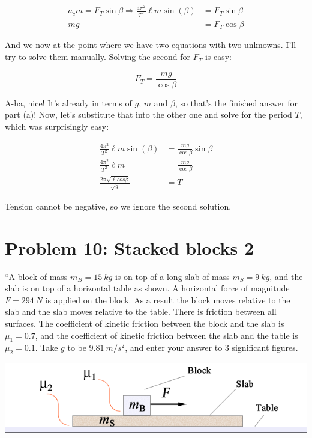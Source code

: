 \documentclass[8.01x]{subfiles}
\begin{document}
\begin{align}
a_c m = F_T \sin \beta \Rightarrow \frac{4\pi^2}{T^2} \ell m \sin (\beta) &= F_T \sin \beta\\
m g &= F_T \cos \beta
\end{align}

And we now at the point where we have two equations with two unknowns. I'll try to solve them manually. Solving the second for $F_T$ is easy:

\begin{equation}
F_T = \frac{m g}{\cos \beta}
\end{equation}

A-ha, nice! It's already in terms of $g$, $m$ and $\beta$, so that's the finished answer for part (a)! Now, let's substitute that into the other one and solve for the period $T$, which was surprisingly easy:

\begin{align}
\frac{4\pi^2}{T^2} \ell m \sin (\beta) &= \frac{m g}{\cos \beta} \sin \beta\\
\frac{4\pi^2}{T^2} \ell m &= \frac{m g}{\cos \beta}\\
\frac{2 \pi \sqrt{\ell cos \beta}}{\sqrt{g}} &= T
\end{align}

Tension cannot be negative, so we ignore the second solution.

\section{Problem 10: Stacked blocks 2}

``A block of mass $m_B = \SI{15}{kg}$ is on top of a long slab of mass $m_S = \SI{9}{kg}$, and the slab is on top of a horizontal table as shown. A horizontal force of magnitude $F = \SI{294}{N}$ is applied on the block. As a result the block moves relative to the slab and the slab moves relative to the table. There is friction between all surfaces. The coefficient of kinetic friction between the block and the slab is $\mu_1 = 0.7$, and the coefficient of kinetic friction between the slab and the table is $\mu_2 = 0.1$. Take $g$ to be $\SI{9.81}{m/s^2}$, and enter your answer to 3 significant figures.

\begin{center}
\includegraphics[scale=1.0]{Graphics/h3p10}
\end{center}
\end{document}
